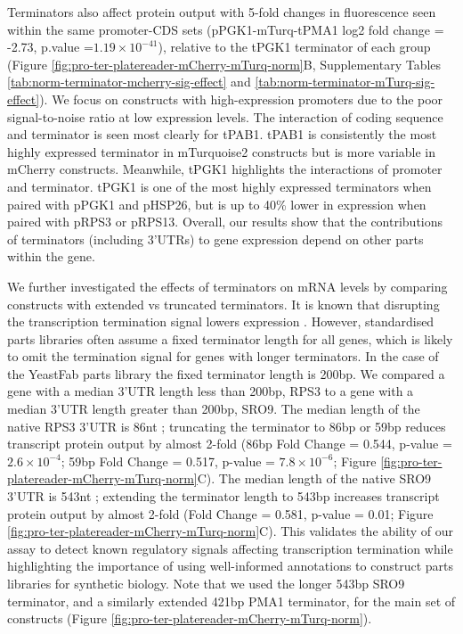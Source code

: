 \documentclass[../main.tex]{subfiles}
\begin{document}
Terminators also affect protein output with 5-fold changes in fluorescence seen within the same promoter-CDS sets (pPGK1-mTurq-tPMA1 log2 fold change = -2.73, p.value =\(1.19 \times 10^{-41}\)), relative to the tPGK1 terminator of each group (Figure \ref{fig:pro-ter-platereader-mCherry-mTurq-norm}B, Supplementary Tables \ref{tab:norm-terminator-mcherry-sig-effect} and \ref{tab:norm-terminator-mTurq-sig-effect}).
We focus on constructs with high-expression promoters due to the poor signal-to-noise ratio at low expression levels.
The interaction of coding sequence and terminator is seen most clearly for tPAB1.
tPAB1 is consistently the most highly expressed terminator in mTurquoise2 constructs but is more variable in mCherry constructs.
Meanwhile, tPGK1 highlights the interactions of promoter and terminator.
tPGK1 is one of the most highly expressed terminators when paired with pPGK1 and pHSP26, but is up to 40\% lower in expression when paired with pRPS3 or pRPS13.
Overall, our results show that the contributions of terminators (including 3'UTRs) to gene expression depend on other parts within the gene.

We further investigated the effects of terminators on mRNA levels by comparing constructs with extended vs truncated terminators.
It is known that disrupting the transcription termination signal lowers expression \parencite{Shalem2015, Guo1996}.
However, standardised parts libraries often assume a fixed terminator length for all genes, which is likely to omit the termination signal for genes with longer terminators.
In the case of the YeastFab parts library \parencite{Guo2015} the fixed terminator length is 200bp.
We compared a gene with a median 3'UTR length less than 200bp, RPS3 to a gene with a median 3'UTR length greater than 200bp, SRO9.
The median length of the native RPS3 3'UTR is 86nt \parencite{Pelechano2013}; truncating the terminator to 86bp or 59bp reduces transcript protein output by almost 2-fold (86bp Fold Change = 0.544, p-value = \(2.6 \times 10^{-4}\); 59bp Fold Change = 0.517, p-value = \(7.8 \times 10^{-6}\); Figure \ref{fig:pro-ter-platereader-mCherry-mTurq-norm}C).
The median length of the native SRO9 3'UTR is 543nt \parencite{Pelechano2013}; extending the terminator length to 543bp increases transcript protein output by almost 2-fold (Fold Change = 0.581, p-value = 0.01; Figure \ref{fig:pro-ter-platereader-mCherry-mTurq-norm}C).
This validates the ability of our assay to detect known regulatory signals affecting transcription termination while highlighting the importance of using well-informed annotations to construct parts libraries for synthetic biology.
Note that we used the longer 543bp SRO9 terminator, and a similarly extended 421bp PMA1 terminator, for the main set of constructs (Figure \ref{fig:pro-ter-platereader-mCherry-mTurq-norm}).
\end{document}
